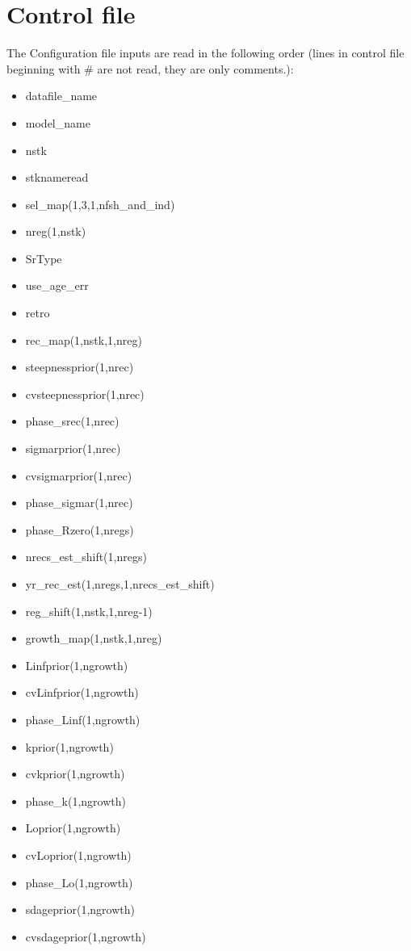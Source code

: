 \documentclass{article}
\begin{document}
\section{Control file}
The Configuration file inputs are read in the following order (lines  in control file beginning with \# are not read, they are only comments.):
\begin{itemize}
    \item datafile\_name
    \item model\_name
    \item nstk
    \item stknameread
    \item sel\_map(1,3,1,nfsh\_and\_ind)
    \item nreg(1,nstk)
    \item SrType 
    \item use\_age\_err
    \item retro 
    \item rec\_map(1,nstk,1,nreg)
    \item steepnessprior(1,nrec)
    \item cvsteepnessprior(1,nrec)
    \item phase\_srec(1,nrec)
    \item sigmarprior(1,nrec)
    \item cvsigmarprior(1,nrec)
    \item phase\_sigmar(1,nrec)
    \item phase\_Rzero(1,nregs)
    \item nrecs\_est\_shift(1,nregs)
    \item yr\_rec\_est(1,nregs,1,nrecs\_est\_shift)
    \item reg\_shift(1,nstk,1,nreg-1)
    \item growth\_map(1,nstk,1,nreg)
    \item Linfprior(1,ngrowth)
    \item cvLinfprior(1,ngrowth)
    \item phase\_Linf(1,ngrowth)
    \item kprior(1,ngrowth)
    \item  cvkprior(1,ngrowth)
    \item phase\_k(1,ngrowth)
    \item Loprior(1,ngrowth)
    \item cvLoprior(1,ngrowth)
    \item phase\_Lo(1,ngrowth)
    \item sdageprior(1,ngrowth)
    \item cvsdageprior(1,ngrowth)

\end{itemize}
\end{document}
